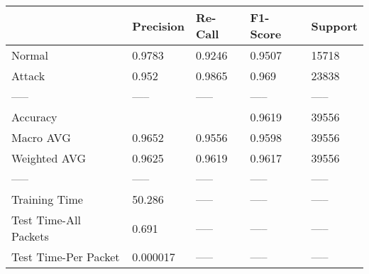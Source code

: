 \begin{tabular}{lllll}
\toprule
{} & Precision & Re-Call & F1-Score & Support \\
\midrule
Normal                &    0.9783 &  0.9246 &   0.9507 &   15718 \\
Attack                &     0.952 &  0.9865 &    0.969 &   23838 \\
-----                 &     ----- &   ----- &    ----- &   ----- \\
Accuracy              &           &         &   0.9619 &   39556 \\
Macro AVG             &    0.9652 &  0.9556 &   0.9598 &   39556 \\
Weighted AVG          &    0.9625 &  0.9619 &   0.9617 &   39556 \\
-----                 &     ----- &   ----- &    ----- &   ----- \\
Training Time         &    50.286 &   ----- &    ----- &   ----- \\
Test Time-All Packets &     0.691 &   ----- &    ----- &   ----- \\
Test Time-Per Packet  &  0.000017 &   ----- &    ----- &   ----- \\
\bottomrule
\end{tabular}
